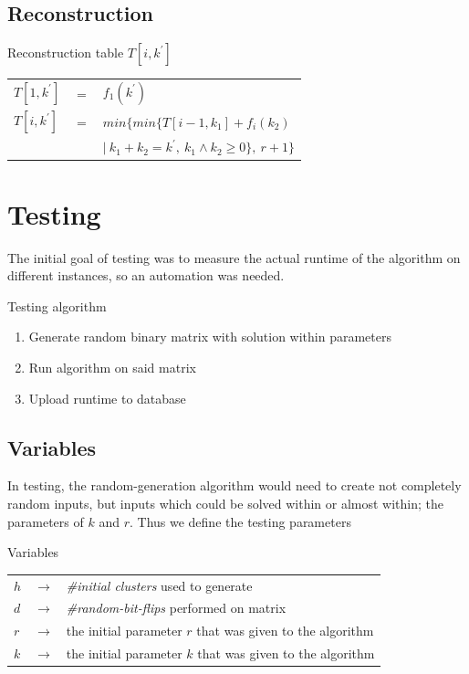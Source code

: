 \documentclass{beamer}
\begin{document}
\subsection{Reconstruction}
\begin{frame}
  \begin{block}{Reconstruction table $T[i,k^\prime]$}
    \begin{tabular}{lcl}
      $T[1, k^\prime]$ & $=$ & $f_1(k^\prime)$                                              \\
      $T[i, k^\prime]$ & $=$ & $min\{ min\{ T[ i-1, k_1 ] + f_i(k_2)$                       \\
                       &     & $|~ k_1 + k_2 = k^\prime, ~k_1 \wedge k_2 \geq 0\}, ~r+1 \}$
    \end{tabular}
  \end{block}
\end{frame}

\section{Testing}
\begin{frame}
  The initial goal of testing was to measure the actual runtime of the algorithm on different instances,
  so an automation was needed.

  \begin{block}{Testing algorithm}
    \begin{enumerate}
      \item<1-> Generate random binary matrix with solution within parameters
      \item<2-> Run algorithm on said matrix
      \item<3-> Upload runtime to database
    \end{enumerate}
  \end{block}
\end{frame}

\subsection{Variables}
\begin{frame}
  In testing, the random-generation algorithm would need to create not completely random inputs, but
  inputs which could be solved within or almost within; the parameters of $k$ and $r$. Thus we define
  the testing parameters

  \begin{block}{Variables}
    \begin{tabular}{lll}
      $h$ & $\rightarrow$ & \textit{\#initial clusters} used to generate              \\
      $d$ & $\rightarrow$ & \textit{\#random-bit-flips} performed on matrix           \\
      $r$ & $\rightarrow$ & the initial parameter $r$ that was given to the algorithm \\
      $k$ & $\rightarrow$ & the initial parameter $k$ that was given to the algorithm \\
    \end{tabular}
  \end{block}
\end{frame}
\end{document}
